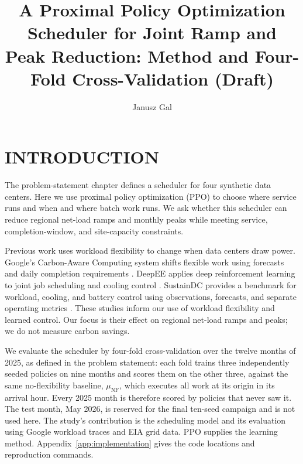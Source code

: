 \documentclass{UNCC-thesis}
\begin{document}
\fbmatterchapterformat
{}
\title{A Proximal Policy Optimization Scheduler for Joint Ramp and Peak Reduction: Method and Four-Fold Cross-Validation (Draft)}
\author{Janusz Gal}

\maketitlepage

\tableofcontents
\listoftables
\listoffigures

\clearpage
{}
\bodychapterformat

\chapter{INTRODUCTION}
\label{sec:introduction}

The problem-statement chapter defines a scheduler for four synthetic data
centers. Here we use proximal policy optimization (PPO) to choose where
service runs and when and where batch work runs. We ask whether this
scheduler can reduce regional net-load ramps and monthly peaks while
meeting service, completion-window, and site-capacity constraints.

Previous work uses workload flexibility to change when data centers draw
power. Google's Carbon-Aware Computing system shifts flexible work using
forecasts and daily completion requirements \cite{radovanovic2021carbonaware}.
DeepEE applies deep reinforcement learning to joint job scheduling and
cooling control \cite{ran2019deepee}. SustainDC provides a benchmark for
workload, cooling, and battery control using observations, forecasts, and
separate operating metrics \cite{naug2024sustaindc}. These studies inform our
use of workload flexibility and learned control. Our focus is their effect
on regional net-load ramps and peaks; we do not measure carbon savings.

We evaluate the scheduler by four-fold cross-validation over the twelve
months of 2025, as defined in the problem statement: each fold trains three
independently seeded policies on nine months and scores them on the other
three, against the same no-flexibility baseline, \(\mu_{\mathrm{NF}}\), which
executes all work at its origin in its arrival hour. Every 2025 month is
therefore scored by policies that never saw it. The test month, May 2026, is
reserved for the final ten-seed campaign and is not used here. The study's
contribution is the
scheduling model and its evaluation using Google workload traces and EIA
grid data. PPO supplies the learning method. Appendix~\ref{app:implementation}
gives the code locations and reproduction commands.
\end{document}
